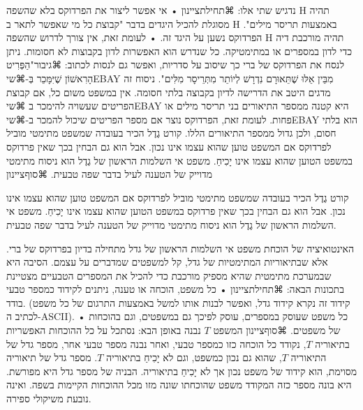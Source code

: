 {\noindent{}

נדגיש שתי אלו: 
⌘תחילת{ציינון}
• אי אפשר ליצור את הפרדוקס בלא שהשפה H תהיה מסוגלת להכיל היגדים בדבר "קבוצת כל מי שאפשר לתאר ב H באמצעות תריסר מילים". הפרדוקס נשען על היגד זה.
• לעומת זאת, אין צורך לדרוש שהשפה H תהיה מורכבת דיה כדי לדון במספרים או במתימטיקה. כל שנדרש הוא האפשרות לדון בקבוצות לא חסומות. ניתן לנסח את הפרדוקס של ברי כך שיסוב על סדריות, ואפשר גם לנסות לכתוב:  ⌘גיבור{"הַפְּרִיט הָרִאשׁוֹן שֶׁיִּמָּכֵר בְּ-⌘שי{EBAY} מִבֵּין אֵלּוּ שֶׁתֵּאוּרָם נִדְרָשׁ לְיוֹתֵר מִתְּרֵיסָר מִלִּים"}. ניסוח זה מדגים היטב את הדרישה לדיון בקבוצה בלתי חסומה. אין במשפט משום כל, אם קבוצת הפריטים שעשויה להימכר ב ⌘שי{EBAY} היא קטנה ממספר התיאורים בני תריסר מילים או פחות. לעומת זאת, הפרדוקס נוצר אם מספר הפריטים שיכול להמכר ב-⌘שי{EBAY} הוא בלתי חסום, ולכן גדול ממספר התיאורים הללו. 
קורט גֶדֶל הכיר בעובדה שמשפט מתימטי מוביל לפרדוקס אם המשפט טוען שהוא עצמו אינו נכון. אבל הוא גם הבחין בכך שאין פרדוקס במשפט הטוען שהוא עצמו אינו יָכִיחַ. משפט אי השלמות הראשון של גֶדֶל הוא ניסוח מתימטי מדוייק של הטענה לעיל בדבר שפה טבעית.
⌘סוף{ציינון}

קורט גֶדֶל הכיר בעובדה שמשפט מתימטי מוביל לפרדוקס אם המשפט טוען שהוא עצמו אינו נכון. אבל הוא גם הבחין בכך שאין פרדוקס במשפט הטוען שהוא עצמו אינו יָכִיחַ. משפט אי השלמות הראשון של גֶדֶל הוא ניסוח מתימטי מדוייק של הטענה לעיל בדבר שפה טבעית.


\noindent{}
האינטואיציה של הוכחת משפט אי השלמות הראשון של גדל מתחילה בדיון בפרדוקס של ברי. אלא שבתיאוריות המתימטיות של גדל, קל למשפטים שמדברים על עצמם. הסיבה היא שבמערכת מתימטית שהיא מספיק מורכבת כדי להכיל את המספרים הטבעיים מצטיינת בתכונות הבאה:
⌘תחילת{ציינון}
• כל משפט, הוכחה או טענה, ניתנים לקידוד כמספר טבעי בודד. (קידוד זה נקרא קידוד גדל, ואפשר לבנות אותו למשל באמצעות התרגום של כל משפט לכתיב ה-ASCII).
• כל משפט שעוסק במספרים, עוסק לפיכך גם במשפטים, וגם בהוכחות של משפטים.
⌘סוף{ציינון}
 המשפט $ T $ נבנה באופן הבא: נסתכל על כל ההוכחות האפשריות בתיאוריה $ T $, נקודד כל הוכחה כזו כמספר טבעי, ואחר נבנה מספר טבעי אחר, מספר גדל של התיאוריה $ T $, שהוא גם נכון כמשפט, וגם לא      יָכִיחַ בתיאוריה $ T $. מספר גדל של תיאוריה מסוימת, הוא קידוד של משפט נכון אך לא יָכִיחַ בתיאוריה. הבניה של מספר גדל היא מפורשת. היא בונה מספר כזה המקודד משפט שהוכחתו שונה מזו מכל ההוכחות הקיימות בשפה. ואינה נובעת משיקולי ספירה.

}
